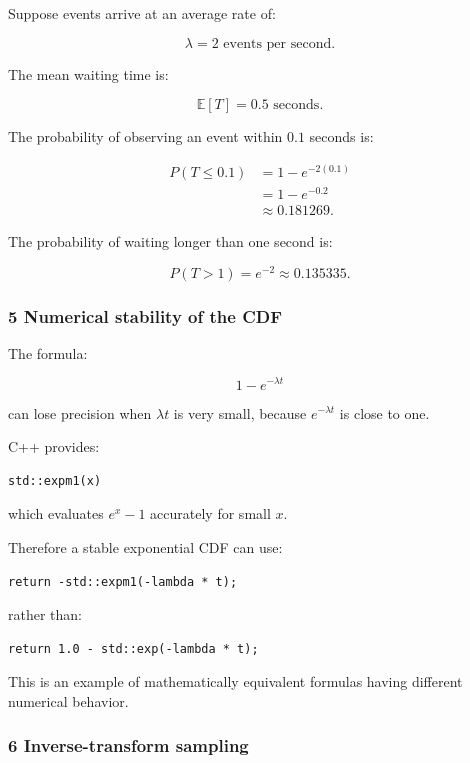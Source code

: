 Suppose events arrive at an average rate of:

\[
 \lambda=2\text{ events per second}.
\]

The mean waiting time is:

\[
 \mathbb E[T]=0.5\text{ seconds}.
\]

The probability of observing an event within \(0.1\) seconds is:

\[
 \begin{aligned} P(T\le0.1) &=1-e^{-2(0.1)}\\ &=1-e^{-0.2}\\ &\approx\boxed{0.181269}. \end{aligned}
\]

The probability of waiting longer than one second is:

\[
 P(T>1)=e^{-2}\approx0.135335.
\]

\subsubsection{5 Numerical stability of the CDF}\label{02-foundations-ii-ch024-numerical-stability-of-the-cdf}

\hypertarget{02-foundations-ii-ch024-numerical-stability-of-the-cdf}{}

The formula:

\[
 1-e^{-\lambda t}
\]

can lose precision when \(\lambda t\) is very small, because \(e^{-\lambda t}\) is close to one.

C++ provides:

\begin{verbatim}
std::expm1(x)
\end{verbatim}

which evaluates \(e^x-1\) accurately for small \(x\).

Therefore a stable exponential CDF can use:

\begin{verbatim}
return -std::expm1(-lambda * t);
\end{verbatim}

rather than:

\begin{verbatim}
return 1.0 - std::exp(-lambda * t);
\end{verbatim}

This is an example of mathematically equivalent formulas having different numerical behavior.

\subsubsection{6 Inverse-transform sampling}\label{02-foundations-ii-ch024-inverse-transform-sampling}

